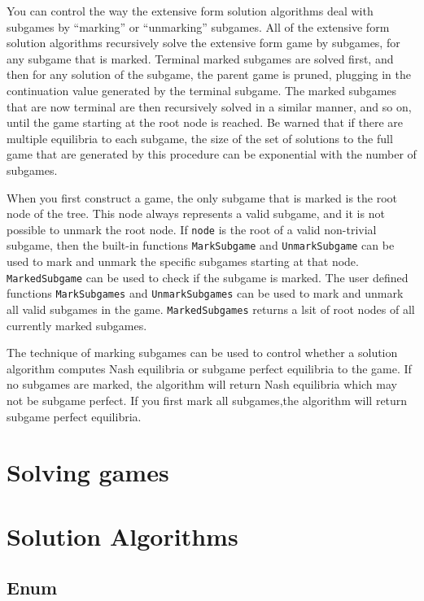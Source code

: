 You can control the way the extensive form solution algorithms deal
with subgames by ``marking'' or ``unmarking'' subgames.  All of the
extensive form solution algorithms recursively solve the extensive
form game by subgames, for any subgame that is marked.  Terminal
marked subgames are solved first, and then for any solution of the
subgame, the parent game is pruned, plugging in the continuation value
generated by the terminal subgame.  The marked subgames that are now
terminal are then recursively solved in a similar manner, and so on,
until the game starting at the root node is reached.  Be warned that
if there are multiple equilibria to each subgame, the size of the set
of solutions to the full game that are generated by this procedure can
be exponential with the number of subgames.

When you first construct a game, the only subgame that is marked is
the root node of the tree.  This node always represents a valid
subgame, and it is not possible to unmark the root node.  If
\verb+node+ is the root of a valid non-trivial subgame, then the
built-in functions \verb+MarkSubgame+ and \verb+UnmarkSubgame+ can be
used to mark and unmark the specific subgames starting at that node.
\verb+MarkedSubgame+ can be used to check if the subgame is marked.
The user defined functions \verb+MarkSubgames+ and
\verb+UnmarkSubgames+ can be used to mark and unmark all valid
subgames in the game.  \verb+MarkedSubgames+ returns a lsit of root
nodes of all currently marked subgames.

The technique of marking subgames can be used to control whether a
solution algorithm computes Nash equilibria or subgame perfect
equilibria to the game.  If no subgames are marked, the algorithm will
return Nash equilibria which may not be subgame perfect.  If you first
mark all subgames,the algorithm will return subgame perfect
equilibria.  

\section{Solving games}

\section{Solution Algorithms}

\subsection{Enum}

